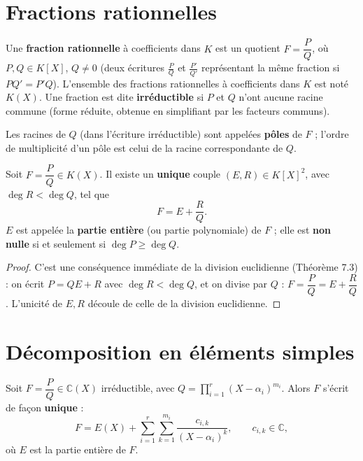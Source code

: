 \documentclass[a4paper,12pt,openany]{book}
\begin{document}
\section{Fractions rationnelles}


\begin{definition}[7.5]
Une \textbf{fraction rationnelle} à coefficients dans $K$ est un quotient
$F=\dfrac{P}{Q}$, où $P,Q\in K[X]$, $Q\neq0$ (deux écritures
$\frac{P}{Q}$ et $\frac{P'}{Q'}$ représentant la même fraction si
$PQ'=P'Q$). L'ensemble des fractions rationnelles à coefficients dans $K$
est noté $K(X)$. Une fraction est dite \textbf{irréductible} si $P$ et
$Q$ n'ont aucune racine commune (forme réduite, obtenue en simplifiant
par les facteurs communs).

Les racines de $Q$ (dans l'écriture irréductible) sont appelées
\textbf{pôles} de $F$ ; l'ordre de multiplicité d'un pôle est celui de la
racine correspondante de $Q$.
\end{definition}

\begin{proposition}
Soit $F=\dfrac{P}{Q}\in K(X)$. Il existe un \textbf{unique} couple
$(E,R)\in K[X]^2$, avec $\deg R < \deg Q$, tel que
\[
F = E + \frac{R}{Q}.
\]
$E$ est appelée la \textbf{partie entière} (ou partie polynomiale) de
$F$ ; elle est \textbf{non nulle} si et seulement si $\deg P\geq\deg Q$.
\end{proposition}

\begin{proof}
C'est une conséquence immédiate de la division euclidienne
(Théorème 7.3) : on écrit $P=QE+R$ avec $\deg R<\deg Q$, et on divise
par $Q$ : $F=\dfrac{P}{Q} = E+\dfrac{R}{Q}$. L'unicité de $E,R$ découle
de celle de la division euclidienne.
\end{proof}

\section{Décomposition en éléments simples}


\begin{theoreme}
Soit $F=\dfrac{P}{Q}\in\mathbb{C}(X)$ irréductible, avec
$Q = \displaystyle\prod_{i=1}^r (X-\alpha_i)^{m_i}$. Alors $F$ s'écrit de
façon \textbf{unique} :
\[
F = E(X) + \sum_{i=1}^{r} \sum_{k=1}^{m_i} \frac{c_{i,k}}{(X-\alpha_i)^k},
\qquad c_{i,k}\in\mathbb{C},
\]
où $E$ est la partie entière de $F$.
\end{theoreme}
\end{document}
